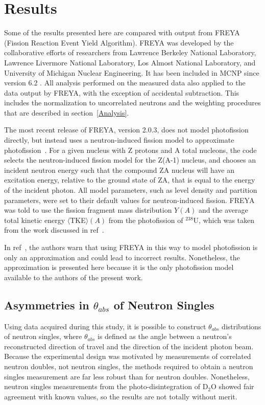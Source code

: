 \chapter{Results}
Some of the results presented here are compared with output from FREYA (Fission Reaction Event Yield Algorithm). 
FREYA was developed by the collaborative efforts of researchers from Lawrence Berkeley National Laboratory,  Lawrence Livermore National Laboratory, Los Almost National Laboratory, and University of Michigan Nuclear Engineering.
It has been included in MCNP since version 6.2 .
All analysis performed on the measured data also applied to the data output by FREYA, with the exception of accidental subtraction.
This includes the normalization to uncorrelated neutrons and the weighting procedures that are described in section~\ref{Analysis}.
 
The most recent release of FREYA, version 2.0.3, does not model photofission directly, but instead uses a neutron-induced fission model to approximate photofission~\cite{FREYA_photofission}.
For a given nucleus with Z protons and A total nucleons, the code selects the neutron-induced fission model for the Z(A-1) nucleus, and chooses an incident neutron energy such that the compound ZA nucleus will have an excitation energy, relative to the ground state of ZA, that is equal to the energy of the incident photon.
All model parameters, such as level density and partition parameters, were set to their default values for neutron-induced fission.
FREYA was told to use the fission fragment mass distribution $Y(A)$ and the average total kinetic energy $\langle$TKE$\rangle(A)$ from the photofission of $^{238}$U, which was taken from the work discussed in ref~\cite{2017Krishichayan}.

In ref~\cite{Talou2018}, the authors warn that using FREYA in this way to model photofission is only an approximation and could lead to incorrect results.
Nonetheless, the approximation is presented here because it is the only photofission model available to the authors of the present work.

\section{Asymmetries in $\theta_{abs}$ of Neutron Singles}
Using data acquired during this study, it is possible to construct $\theta_{abs}$ distributions of neutron singles, where $\theta_{abs}$ is defined as the angle between a neutron's reconstructed direction of travel and the direction of the incident photon beam.
Because the experimental design was motivated by measurements of correlated neutron doubles, not neutron singles, the methods required to obtain a neutron singles measurement are far less robust than for neutron doubles.
Nonetheless, neutron singles measurements from the photo-disintegration of D$_{2}$O showed fair agreement with known values, so the results are not totally without merit.

